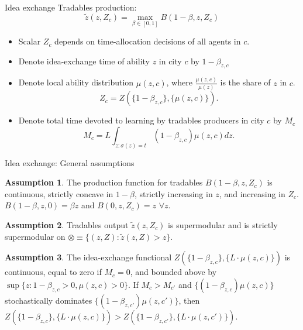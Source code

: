 \documentclass[11pt,notes=hide,aspectratio=169]{beamer}
\begin{document}
\begin{frame}{Idea exchange}
Tradables production:
		\begin{equation*}
		\tilde{z}(z,Z_c) = \max_{\beta\in[0,1]} B(1-\beta,z,Z_c)
		\end{equation*}
\begin{itemize}
\item Scalar $Z_c$ depends on time-allocation decisions of all agents in $c$. 
\item Denote idea-exchange time of ability $z$ in city $c$ by $1-\beta_{z,c}$ 
\item Denote local ability distribution $\mu(z,c)$, where $\frac{\mu(z,c)}{\mu(z)}$ is the share of $z$ in $c$.
		\begin{equation*}
		Z_c = Z(\{1-\beta_{z,c}\},\{\mu(z,c)\}). \label{eqn:bigZfunction}
		\end{equation*}
\item Denote total time devoted to learning by tradables producers in city $c$ by $M_c$
\begin{equation*}
M_{c} = L \int_{z: \sigma(z)=t}(1-\beta_{z,c})\mu(z,c) dz.
\end{equation*}
\end{itemize}
\end{frame}
\begin{frame}{Idea exchange: General assumptions}
\begin{itemize}
{\small
\item \textbf{Assumption 1}. 
The production function for tradables
$B(1-\beta,z,Z_c)$ is continuous,
strictly concave in $1-\beta$,
strictly increasing in $z$, and increasing in $Z_c$.
$B(1-\beta,z,0)=\beta z$ and $B(0,z,Z_c)=z$ $\forall z$.
\item \textbf{Assumption 2}. 
Tradables output $\tilde{z}(z,Z_c)$ is supermodular and
is strictly supermodular on $\otimes \equiv \{(z,Z): \tilde{z}(z,Z)>z\}$.
\item \textbf{Assumption 3}. 
The idea-exchange functional
$Z(\{1-\beta_{z,c}\},\{L\cdot\mu(z,c)\})$
is continuous, equal to zero if $M_c=0$, and bounded above by $\sup \{z:1-\beta_{z,c}>0,\mu(z,c)>0\}$.
If  $M_{c} > M_{c'}$ and $\{(1-\beta_{z,c})\mu(z,c)\}$ stochastically dominates $\{(1-\beta_{z,c'})\mu(z,c')\}$,
then $Z(\{1-\beta_{z,c}\},\{L\cdot\mu(z,c)\})>Z(\{1-\beta_{z,c'}\},\{L\cdot\mu(z,c')\})$.
}
\end{itemize}
\end{frame}
\end{document}
